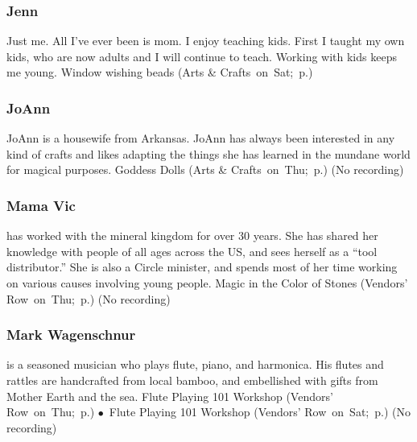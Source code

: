\vspace{6pt}

\subsubsection{Jenn} %
{  \small  Just me. 
All I've ever been is mom. I enjoy teaching kids. First I taught my own kids, who are now adults and I will continue to teach. Working with kids keeps me young.  } %
\hspace{2em} {\footnotesize Window wishing beads (Arts \& Crafts~on~Sat;~p.\pageref{Sat-Jordan1})}

\vspace{6pt}

\subsubsection{JoAnn} %
{  \small  JoAnn is a housewife from Arkansas. JoAnn has always been interested in any kind of crafts and likes adapting the things she has learned in the mundane world for magical purposes. } %
\hspace{2em} {\footnotesize Goddess Dolls (Arts \& Crafts~on~Thu;~p.\pageref{Thu-JoAnn1})}
 {\small (No recording)} 

\vspace{6pt}

\subsubsection{Mama Vic} %
{  \small  has worked with the mineral kingdom for over 30 years.  She has shared her knowledge with people of all ages across the US, and sees herself as a ``tool distributor.''  She is also a Circle minister, and spends most of her time working on various causes involving young people. } %
\hspace{2em} {\footnotesize Magic in the Color of Stones (Vendors' Row~on~Thu;~p.\pageref{Thu-magcolor})}
 {\small (No recording)} 

\vspace{6pt}

\subsubsection{Mark Wagenschnur} %
{  \small  is a seasoned musician who plays flute, piano, and harmonica.  His flutes and rattles are handcrafted from local bamboo, and embellished with gifts from Mother Earth and the sea. } %
\hspace{2em} {\footnotesize Flute Playing 101 Workshop (Vendors' Row~on~Thu;~p.\pageref{Thu-Mark1}) $\bullet$~Flute Playing 101 Workshop (Vendors' Row~on~Sat;~p.\pageref{Sat-Mark2})}
 {\small (No recording)} 

